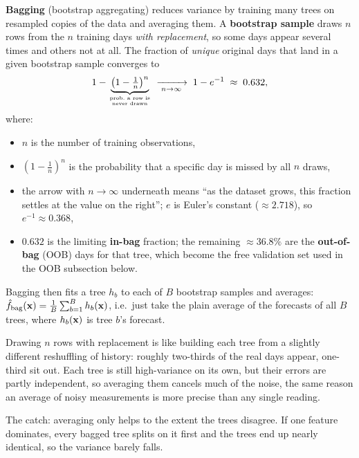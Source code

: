 \textbf{Bagging} (bootstrap aggregating) reduces variance by training many
trees on resampled copies of the data and averaging them.  A
\textbf{bootstrap sample} draws $n$ rows from the $n$ training days
\emph{with replacement}, so some days appear several times and others not at
all.  The fraction of \emph{unique} original days that land in a given
bootstrap sample converges to
\begin{equation}\label{eq:trees:bootstrap632}
  1 - \underbrace{\left(1 - \tfrac{1}{n}\right)^{n}}_{\text{prob.\ a row is}\atop\text{never drawn}}
  \;\xrightarrow[\;n\to\infty\;]{}\;
  1 - e^{-1} \;\approx\; 0.632,
\end{equation}
where:
\begin{itemize}[leftmargin=1.8em]
  \item $n$ is the number of training observations,
  \item $(1-\tfrac{1}{n})^n$ is the probability that a specific day is
        missed by all $n$ draws,
  \item the arrow with $n\to\infty$ underneath means ``as the dataset grows,
        this fraction settles at the value on the right''; $e$ is Euler's
        constant ($\approx 2.718$), so $e^{-1}\approx 0.368$,
  \item $0.632$ is the limiting \textbf{in-bag} fraction; the remaining
        $\approx 36.8\%$ are the \textbf{out-of-bag} (OOB) days for that tree,
        which become the free validation set used in the OOB subsection below.
\end{itemize}
Bagging then fits a tree $h_b$ to each of $B$ bootstrap samples and averages:
$\hat{f}_{\text{bag}}(\mathbf{x}) = \tfrac{1}{B}\sum_{b=1}^{B} h_b(\mathbf{x})$, i.e.\ just
take the plain average of the forecasts of all $B$ trees, where $h_b(\mathbf{x})$ is
tree $b$'s forecast.

\begin{intuition}
Drawing $n$ rows with replacement is like building each tree from a slightly
different reshuffling of history: roughly two-thirds of the real days appear,
one-third sit out.  Each tree is still high-variance on
its own, but their errors are partly independent, so averaging them cancels
much of the noise, the same reason an average of noisy measurements is more
precise than any single reading.
\end{intuition}

The catch: averaging only helps to the extent the trees disagree.  If one
feature dominates, every bagged tree splits on it first and the trees end up
nearly identical, so the variance barely falls.

